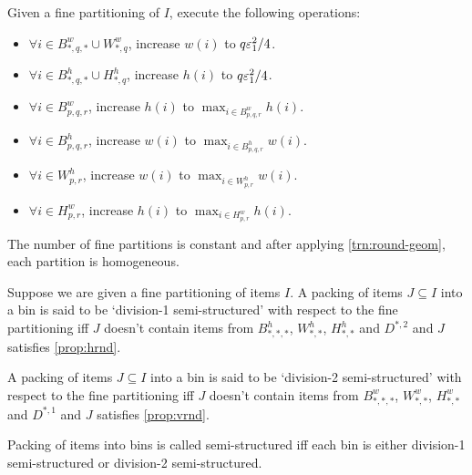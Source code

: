 \begin{transformation}
\label{trn:round-geom}
Given a fine partitioning of $I$, execute the following operations:
\begin{itemize}
\item $\forall i \in B^w_{*,q,*} \cup W^w_{*,q}$, increase $w(i)$ to $q\varepsilon_1^2/4$.
\item $\forall i \in B^h_{*,q,*} \cup H^h_{*,q}$, increase $h(i)$ to $q\varepsilon_1^2/4$.
\item $\forall i \in B^w_{p,q,r}$, increase $h(i)$ to $\max_{i \in B^w_{p,q,r}} h(i)$.
\item $\forall i \in B^h_{p,q,r}$, increase $w(i)$ to $\max_{i \in B^h_{p,q,r}} w(i)$.
\item $\forall i \in W^h_{p,r}$, increase $w(i)$ to $\max_{i \in W^h_{p,r}} w(i)$.
\item $\forall i \in H^w_{p,r}$, increase $h(i)$ to $\max_{i \in H^w_{p,r}} h(i)$.
\end{itemize}
\end{transformation}

The number of fine partitions is constant and after applying \cref{trn:round-geom},
each partition is homogeneous.

\begin{definition}
\label{defn:semi-struct}
Suppose we are given a fine partitioning of items $I$.
A packing of items $J \subseteq I$ into a bin is said to be `division-1 semi-structured'
with respect to the fine partitioning iff
$J$ doesn't contain items from $B^h_{*,*,*}$, $W^h_{*,*}$, $H^h_{*,*}$ and $D^{*,2}$
and $J$ satisfies \cref{prop:hrnd}.

A packing of items $J \subseteq I$ into a bin is said to be `division-2 semi-structured'
with respect to the fine partitioning iff
$J$ doesn't contain items from $B^w_{*,*,*}$, $W^w_{*,*}$, $H^w_{*,*}$ and $D^{*,1}$
and $J$ satisfies \cref{prop:vrnd}.

Packing of items into bins is called semi-structured iff
each bin is either division-1 semi-structured or division-2 semi-structured.
\end{definition}


